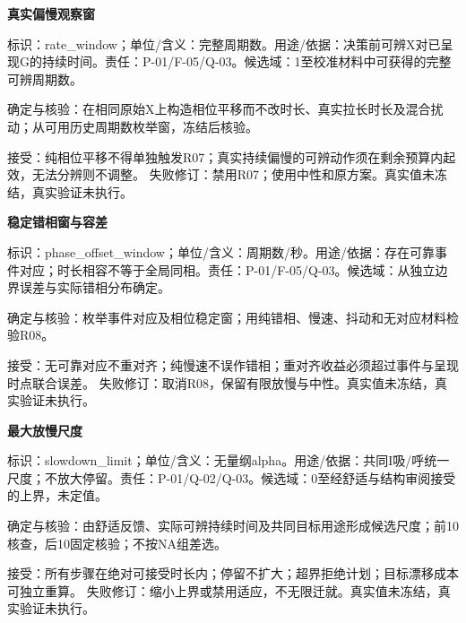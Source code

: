\documentclass[11pt,a4paper]{article}
\newcommand{\reviewsubsection}[1]{\par\Needspace{4\baselineskip}\begin{center}{\titlelatin\titlecjk\bfseries\fontsize{12}{18}\selectfont #1}\end{center}}
\begin{document}
\begin{minipage}{\linewidth}
\reviewsubsection{8.4 真实偏慢观察窗}
标识：rate\_\allowbreak{}window；单位/\allowbreak{}含义：完整周期数。用途/\allowbreak{}依据：决策前可辨X对已呈现G的持续时间。责任：P-\allowbreak{}01/\allowbreak{}F-\allowbreak{}05/\allowbreak{}Q-\allowbreak{}03。候选域：1至校准材料中可获得的完整可辨周期数。

确定与核验：在相同原始X上构造相位平移而不改时长、真实拉长时长及混合扰动；从可用历史周期数枚举窗，冻结后核验。

接受：纯相位平移不得单独触发R07；真实持续偏慢的可辨动作须在剩余预算内起效，无法分辨则不调整。 失败修订：禁用R07；使用中性和原方案。真实值未冻结，真实验证未执行。
\end{minipage}\par

\begin{minipage}{\linewidth}
\reviewsubsection{8.5 稳定错相窗与容差}
标识：phase\_\allowbreak{}offset\_\allowbreak{}window；单位/\allowbreak{}含义：周期数/\allowbreak{}秒。用途/\allowbreak{}依据：存在可靠事件对应；时长相容不等于全局同相。责任：P-\allowbreak{}01/\allowbreak{}F-\allowbreak{}05/\allowbreak{}Q-\allowbreak{}03。候选域：从独立边界误差与实际错相分布确定。

确定与核验：枚举事件对应及相位稳定窗；用纯错相、慢速、抖动和无对应材料检验R08。

接受：无可靠对应不重对齐；纯慢速不误作错相；重对齐收益必须超过事件与呈现时点联合误差。 失败修订：取消R08，保留有限放慢与中性。真实值未冻结，真实验证未执行。
\end{minipage}\par

\begin{minipage}{\linewidth}
\reviewsubsection{8.6 最大放慢尺度}
标识：slowdown\_\allowbreak{}limit；单位/\allowbreak{}含义：无量纲alpha。用途/\allowbreak{}依据：共同I吸/\allowbreak{}呼统一尺度；不放大停留。责任：P-\allowbreak{}01/\allowbreak{}Q-\allowbreak{}02/\allowbreak{}Q-\allowbreak{}03。候选域：0至经舒适与结构审阅接受的上界，未定值。

确定与核验：由舒适反馈、实际可辨持续时间及共同目标用途形成候选尺度；前10核查，后10固定核验；不按NA组差选。

接受：所有步骤在绝对可接受时长内；停留不扩大；超界拒绝计划；目标漂移成本可独立重算。 失败修订：缩小上界或禁用适应，不无限迁就。真实值未冻结，真实验证未执行。
\end{minipage}\par
\end{document}
